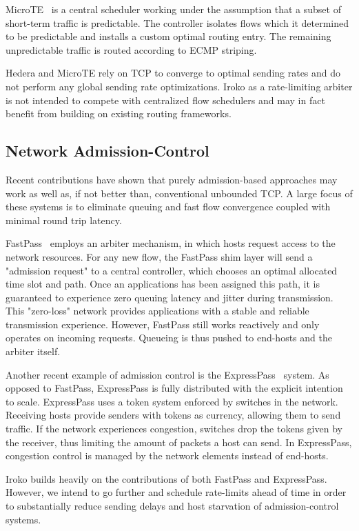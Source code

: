 MicroTE~\cite{microte} is a central scheduler working under the 
assumption that a subset of short-term traffic is predictable. The controller 
isolates flows which it determined to be predictable and installs a custom 
optimal routing entry. The remaining unpredictable traffic is routed according 
to ECMP striping.

Hedera and MicroTE rely on TCP to converge to optimal sending rates and do not 
perform any global sending rate optimizations.
Iroko as a rate-limiting arbiter is not intended to compete with centralized 
flow schedulers and may in fact benefit from building on existing routing 
frameworks.

\subsection{Network Admission-Control}
Recent contributions have shown that purely admission-based approaches 
may work as well as, if not better than, conventional unbounded TCP. A large 
focus of these systems is to eliminate queuing and fast flow 
convergence coupled with minimal round trip latency.

FastPass~\cite{fastpass} employs an arbiter mechanism, in which hosts request 
access to the network resources. For any new flow, the FastPass shim layer will 
send a "admission request" to a central controller, which chooses an optimal 
allocated time slot and path. Once an applications has been assigned this path, 
it is guaranteed to experience zero queuing latency and jitter during 
transmission. This "zero-loss" network provides applications with a stable and 
reliable transmission experience. However, FastPass still works reactively and 
only operates on incoming requests. Queueing is thus pushed to end-hosts and 
the arbiter itself.

Another recent example of admission control is the 
ExpressPass~\cite{expresspass} system. As opposed to FastPass, ExpressPass is 
fully distributed with the explicit intention to scale. ExpressPass uses a 
token system enforced by switches in the network. Receiving hosts provide 
senders with tokens as currency, allowing them to send traffic. If the network 
experiences congestion, switches drop the tokens given by the receiver, thus 
limiting the amount of packets a host can send. In ExpressPass, congestion 
control is managed by the network elements instead of end-hosts.

Iroko builds heavily on the contributions of both FastPass and ExpressPass. 
However, we intend to go further and schedule rate-limits ahead of time in 
order to substantially reduce sending delays and host starvation of admission-control systems.



